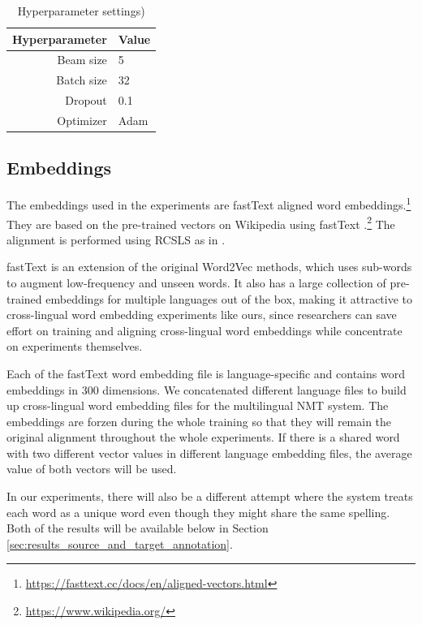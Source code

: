 \documentclass[thesis,fonts=libertine]{cluu}
\begin{document}
\begin{table}
  \centering
  \begin{tabular}{|r|l|}
    \hline
    Hyperparameter & Value \\ [0.25ex]
    \hline\hline
    Beam size & 5 \\
    \hline
    Batch size & 32 \\ 
    \hline
    Dropout & 0.1 \\
    \hline
    Optimizer & Adam \parencite{Kingma:2014aa} \\
    \hline
  \end{tabular}
  \caption{Hyperparameter settings)}
  \label{table:hyperparameters}
\end{table}

\subsection{Embeddings}

The embeddings used in the experiments are fastText aligned word embeddings.\footnote{\url{https://fasttext.cc/docs/en/aligned-vectors.html}} They are based on the pre-trained vectors on Wikipedia using fastText \parencite{Bojanowski:2016aa}.\footnote{\url{https://www.wikipedia.org/}} The alignment is performed using RCSLS as in \textcite{Joulin:2018aa}.

fastText is an extension of the original Word2Vec methods, which uses sub-words to augment low-frequency and unseen words. It also has a large collection of pre-trained embeddings for multiple languages out of the box, making it attractive to cross-lingual word embedding experiments like ours, since researchers can save effort on training and aligning cross-lingual word embeddings while concentrate on experiments themselves.

Each of the fastText word embedding file is language-specific and contains word embeddings in 300 dimensions. We concatenated different language files to build up cross-lingual word embedding files for the multilingual NMT system. The embeddings are forzen during the whole training so that they will remain the original alignment throughout the whole experiments. If there is a shared word with two different vector values in different language embedding files, the average value of both vectors will be used.

In our experiments, there will also be a different attempt where the system treats each word as a unique word even though they might share the same spelling. Both of the results will be available below in Section \ref{sec:results_source_and_target_annotation}.
\end{document}
